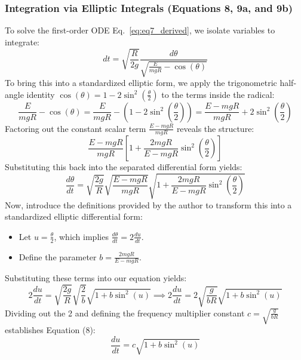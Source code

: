 \documentclass[11pt,letterpaper]{article}
\begin{document}
\subsubsection{Integration via Elliptic Integrals (Equations 8, 9a, and 9b)}
To solve the first-order ODE Eq.~\eqref{eq:eq7_derived}, we isolate variables to integrate:
\begin{equation*}
dt = \sqrt{\frac{R}{2g}} \frac{d\theta}{\sqrt{\frac{E}{mgR} - \cos(\theta)}}
\end{equation*}
To bring this into a standardized elliptic form, we apply the trigonometric half-angle identity $\cos(\theta) = 1 - 2\sin^2\left(\frac{\theta}{2}\right)$ to the terms inside the radical:
\begin{equation*}
\frac{E}{mgR} - \cos(\theta) = \frac{E}{mgR} - \left(1 - 2\sin^2\left(\frac{\theta}{2}\right)\right) = \frac{E - mgR}{mgR} + 2\sin^2\left(\frac{\theta}{2}\right)
\end{equation*}
Factoring out the constant scalar term $\frac{E-mgR}{mgR}$ reveals the structure:
\begin{equation*}
\frac{E - mgR}{mgR}\left[1 + \frac{2mgR}{E - mgR}\sin^2\left(\frac{\theta}{2}\right)\right]
\end{equation*}
Substituting this back into the separated differential form yields:
\begin{equation*}
\frac{d\theta}{dt} = \sqrt{\frac{2g}{R}}\sqrt{\frac{E - mgR}{mgR}} \sqrt{1 + \frac{2mgR}{E - mgR}\sin^2\left(\frac{\theta}{2}\right)}
\end{equation*}
Now, introduce the definitions provided by the author to transform this into a standardized elliptic differential form:
\begin{itemize}
    \item Let $u = \frac{\theta}{2}$, which implies $\frac{d\theta}{dt} = 2\frac{du}{dt}$.
    \item Define the parameter $b = \frac{2mgR}{E - mgR}$.
\end{itemize}
Substituting these terms into our equation yields:
\begin{equation*}
2\frac{du}{dt} = \sqrt{\frac{2g}{R}}\sqrt{\frac{2}{b}}\sqrt{1 + b\sin^2(u)} \implies 2\frac{du}{dt} = 2\sqrt{\frac{g}{bR}}\sqrt{1 + b\sin^2(u)}
\end{equation*}
Dividing out the 2 and defining the frequency multiplier constant $c = \sqrt{\frac{g}{bR}}$ establishes Equation (8):
\begin{equation}\label{eq:eq8_derived}
\frac{du}{dt} = c\sqrt{1 + b\sin^2(u)}
\end{equation}
\end{document}
